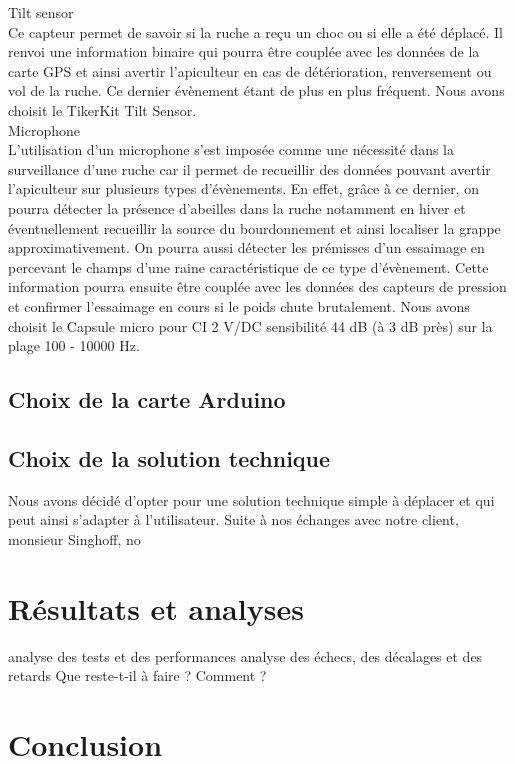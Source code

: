 Tilt sensor\\

Ce capteur permet de savoir si la ruche a reçu un choc ou si elle a été déplacé. Il renvoi une information binaire qui pourra être couplée avec les données de la carte GPS et ainsi avertir l'apiculteur en cas de détérioration, renversement ou vol de la ruche. Ce dernier évènement étant de plus en plus fréquent.
Nous avons choisit le TikerKit Tilt Sensor.\\

Microphone\\

L'utilisation d'un microphone s'est imposée comme une nécessité dans la surveillance d'une ruche car il permet de recueillir des données pouvant avertir l'apiculteur sur plusieurs types d'évènements. En effet, grâce à ce dernier, on pourra détecter la présence d'abeilles dans la ruche notamment en hiver et éventuellement recueillir la source du bourdonnement et ainsi localiser la grappe approximativement. On pourra aussi détecter les prémisses d'un essaimage en percevant le champs d'une raine caractéristique de ce type d'évènement. Cette information pourra ensuite être couplée avec les données des capteurs de pression et confirmer l'essaimage en cours si le poids chute brutalement. 
Nous avons choisit le Capsule micro pour CI 2 V/DC sensibilité 44 dB (à 3 dB près) sur la plage 100 - 10000 Hz. 

\section{Choix de la carte Arduino}
\vspace{1.5cm}

\section{Choix de la solution technique}
\vspace{1.5cm}

Nous avons décidé d'opter pour une solution technique simple à déplacer et qui peut ainsi s'adapter à l'utilisateur.
Suite à nos échanges avec notre client, monsieur Singhoff, no
\chapter{Résultats et analyses}

analyse des tests et des performances
analyse des échecs, des décalages et des retards
Que reste-t-il à faire ? Comment ?


\chapter{Conclusion}
